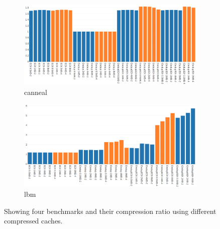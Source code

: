\begin{figure}
    \begin{subfigure}{\textwidth}
        \includegraphics[width=\textwidth]{canneal-compratio.png}
        \caption{canneal}
    \end{subfigure}
    \begin{subfigure}{\textwidth}
        \includegraphics[width=\textwidth]{lbm-compratio.png}
        \caption{lbm}
    \end{subfigure}
    \caption[Case Study: Compression1]{Showing four benchmarks and their compression ratio using different compressed caches.}
    \label{fig:case_compratio1}
\end{figure}
